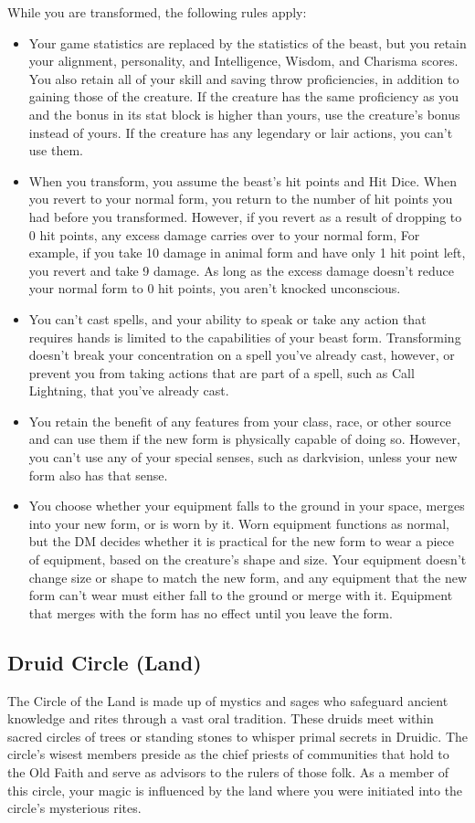 \documentclass[letterpaper,openany,oneside,twocolumn]{book}
\begin{document}
While you are transformed, the following rules apply:
\begin{itemize}
	\item Your game statistics are replaced by the statistics of the beast, but you retain your alignment, personality, and Intelligence, Wisdom, and Charisma scores. You also retain all of your skill and saving throw proficiencies, in addition to gaining those of the creature. If the creature has the same proficiency as you and the bonus in its stat block is higher than yours, use the creature's bonus instead of yours. If the creature has any legendary or lair actions, you can't use them.
	\item When you transform, you assume the beast's hit points and Hit Dice. When you revert to your normal form, you return to the number of hit points you had before you transformed. However, if you revert as a result of dropping to 0 hit points, any excess damage carries over to your normal form, For example, if you take 10 damage in animal form and have only 1 hit point left, you revert and take 9 damage. As long as the excess damage doesn't reduce your normal form to 0 hit points, you aren't knocked unconscious.
	\item You can't cast spells, and your ability to speak or take any action that requires hands is limited to the capabilities of your beast form. Transforming doesn't break your concentration on a spell you've already cast, however, or prevent you from taking actions that are part of a spell, such as Call Lightning, that you've already cast.
	\item You retain the benefit of any features from your class, race, or other source and can use them if the new form is physically capable of doing so. However, you can't use any of your special senses, such as darkvision, unless your new form also has that sense.
	\item You choose whether your equipment falls to the ground in your space, merges into your new form, or is worn by it. Worn equipment functions as normal, but the DM decides whether it is practical for the new form to wear a piece of equipment, based on the creature's shape and size. Your equipment doesn't change size or shape to match the new form, and any equipment that the new form can't wear must either fall to the ground or merge with it. Equipment that merges with the form has no effect until you leave the form.
\end{itemize}
\subsection*{Druid Circle (Land)}
The Circle of the Land is made up of mystics and sages who safeguard ancient knowledge and rites through a vast oral tradition. These druids meet within sacred circles of trees or standing stones to whisper primal secrets in Druidic. The circle's wisest members preside as the chief priests of communities that hold to the Old Faith and serve as advisors to the rulers of those folk. As a member of this circle, your magic is influenced by the land where you were initiated into the circle's mysterious rites.
\end{document}
